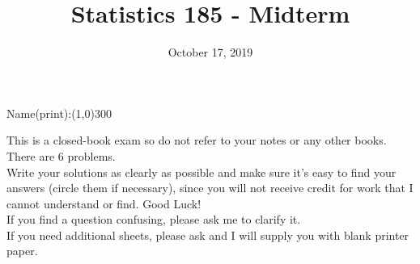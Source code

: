 \documentclass[12 point]{article}
\title{Statistics 185 - Midterm}
\date{October 17, 2019}
\begin{document}
\thispagestyle{empty}
\maketitle
\vspace{2cm}
\begin{center}Name(print):\line(1,0){300}\end{center}

\vspace{1.5cm}
\noindent This is a closed-book exam so do not refer to your notes or any
other books.  There are 6 problems.\\

\noindent Write your solutions as clearly as possible and make sure it's easy to find your answers (circle them if necessary), since you will not receive credit for work that I cannot understand or find. Good Luck! \\

\noindent If you find a question confusing, please ask me to clarify it. \\

\noindent If you need additional sheets, please ask and I will supply you with blank printer paper.
\end{document}

